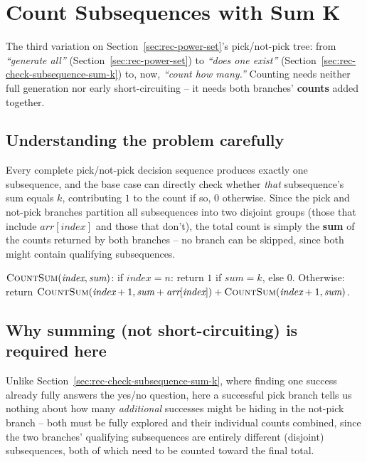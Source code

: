 \section{Count Subsequences with Sum K}
\label{sec:rec-count-subsequence-sum-k}


\begin{patternbox}
The third variation on Section~\ref{sec:rec-power-set}'s pick/not-pick
tree: from \emph{``generate all''} (Section~\ref{sec:rec-power-set}) to
\emph{``does one exist''} (Section~\ref{sec:rec-check-subsequence-sum-k})
to, now, \emph{``count how many.''} Counting needs neither full
generation nor early short-circuiting -- it needs both branches'
\textbf{counts} added together.
\end{patternbox}

\subsection*{Understanding the problem carefully}

Every complete pick/not-pick decision sequence produces exactly one
subsequence, and the base case can directly check whether \emph{that}
subsequence's sum equals $k$, contributing $1$ to the count if so, $0$
otherwise. Since the pick and not-pick branches partition all
subsequences into two disjoint groups (those that include
$\textit{arr}[\textit{index}]$ and those that don't), the total count is
simply the \textbf{sum} of the counts returned by both branches -- no
branch can be skipped, since both might contain qualifying subsequences.

\begin{ideabox}
$\textsc{CountSum}(\textit{index}, \textit{sum})$: if
$\textit{index} = n$: return $1$ if $\textit{sum} = k$, else $0$.
Otherwise: return $\textsc{CountSum}(\textit{index}+1, \textit{sum} +
\textit{arr}[\textit{index}]) + \textsc{CountSum}(\textit{index}+1,
\textit{sum})$.
\end{ideabox}

\subsection*{Why summing (not short-circuiting) is required here}

Unlike Section~\ref{sec:rec-check-subsequence-sum-k}, where finding one
success already fully answers the yes/no question, here a successful
pick branch tells us nothing about how many \emph{additional} successes
might be hiding in the not-pick branch -- both must be fully explored and
their individual counts combined, since the two branches' qualifying
subsequences are entirely different (disjoint) subsequences, both of
which need to be counted toward the final total.


